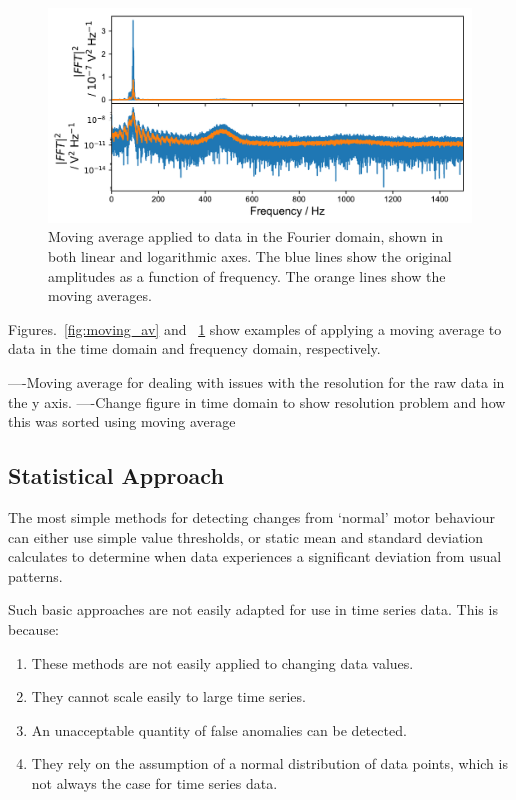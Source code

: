 \begin{figure}[t]
    \includegraphics[width=1.0\textwidth]{fig/freq_moving_average.pdf}
    \caption[Moving Average in Fourier Domain]{Moving average applied to data in the Fourier domain, shown in both linear and logarithmic axes. The blue lines show the original amplitudes as a function of frequency. The orange lines show the moving averages.}
    \label{fig:freq_moving_av}
\end{figure}

Figures.~\ref{fig:moving_av} and ~\ref{fig:freq_moving_av} show examples of applying a moving average to data in the time domain and frequency domain, respectively. 


----Moving average for dealing with issues with the resolution for the raw data in the y axis.
----Change figure in time domain to show resolution problem and how this was sorted using moving average

\subsection{Statistical Approach}

The most simple methods for detecting changes from `normal' motor behaviour can either use simple value thresholds, or static mean and standard deviation calculates to determine when data experiences a significant deviation from usual patterns. 

Such basic approaches are not easily adapted for use in time series data. This is because:

\begin{enumerate}
    \item These methods are not easily applied to changing data values.
    \item They cannot scale easily to large time series.
    \item An unacceptable quantity of false anomalies can be detected.
    \item They rely on the assumption of a normal distribution of data points, which is not always the case for time series data.
\end{enumerate}

